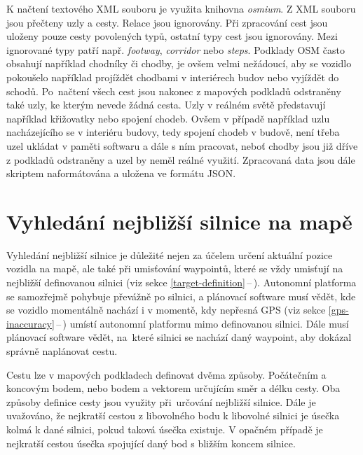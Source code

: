 \documentclass[czech, bachelor]{diploma}
\newcommand{\peteref}[1]{\ref{#1}\,--\,\nameref{#1}}
\begin{document}
K načtení textového XML souboru je využita knihovna \emph{osmium}. Z XML souboru jsou přečteny uzly a cesty. Relace jsou
ignorovány. Při zpracování cest jsou uloženy pouze cesty povolených typů, ostatní typy cest jsou ignorovány. Mezi ignorované typy
patří např. \emph{footway}, \emph{corridor} nebo \emph{steps}. Podklady OSM často obsahují například chodníky či chodby, je ovšem
velmi nežádoucí, aby se vozidlo pokoušelo například projíždět chodbami v interiérech budov nebo vyjíždět do schodů. Po~načtení
všech cest jsou nakonec z mapových podkladů odstraněny také uzly, ke kterým nevede žádná cesta. Uzly v reálném světě představují
například křižovatky nebo spojení chodeb. Ovšem v případě například uzlu nacházejícího se v interiéru budovy, tedy spojení chodeb
v budově, není třeba uzel ukládat v paměti softwaru a dále s ním pracovat, neboť chodby jsou již dříve z podkladů odstraněny
a uzel by neměl reálné využití. Zpracovaná data jsou dále skriptem naformátována a uložena ve formátu JSON\cite{json-source}.

\section{Vyhledání nejbližší silnice na mapě}

Vyhledání nejbližší silnice je důležité nejen za účelem určení aktuální pozice vozidla na mapě, ale také při umisťování waypointů,
které se vždy umisťují na nejbližší definovanou silnici (viz sekce \peteref{target-definition}). Autonomní platforma
se samozřejmě pohybuje převážně po silnici, a plánovací software musí vědět, kde se vozidlo momentálně nachází i v momentě,
kdy nepřesná GPS (viz sekce \peteref{gps-inaccuracy}) umístí autonomní platformu mimo definovanou silnici. Dále musí plánovací
software vědět, na~které silnici se nachází daný waypoint, aby dokázal správně naplánovat cestu.

Cestu lze v mapových podkladech definovat dvěma způsoby. Počátečním a koncovým bodem, nebo bodem a vektorem určujícím směr a délku
cesty. Oba způsoby definice cesty jsou využity při~určování nejbližší silnice. Dále je uvažováno, že nejkratší cestou
z libovolného bodu k libovolné silnici je úsečka kolmá k dané silnici, pokud taková úsečka existuje. V opačném případě
je nejkratší cestou úsečka spojující daný bod s bližším koncem silnice.
\end{document}
